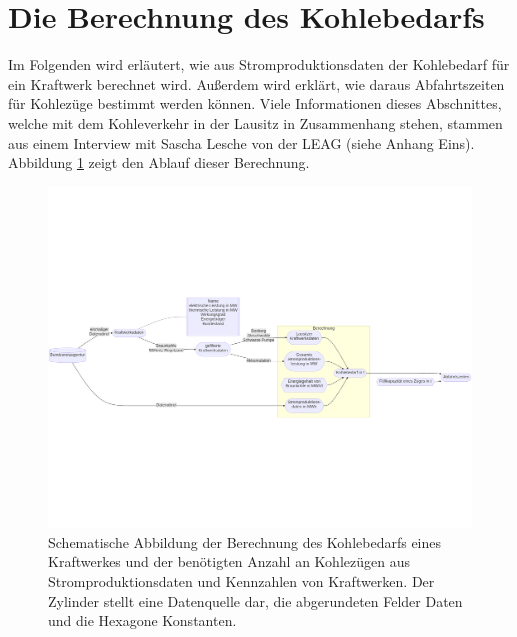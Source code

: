 \section{Die Berechnung des Kohlebedarfs}

Im Folgenden wird erläutert, wie aus Stromproduktionsdaten der Kohlebedarf für ein Kraftwerk berechnet wird. Außerdem wird erklärt, wie daraus Abfahrtszeiten für Kohlezüge bestimmt werden können. Viele Informationen dieses Abschnittes, welche mit dem Kohleverkehr in der Lausitz in Zusammenhang stehen, stammen aus einem Interview mit Sascha Lesche von der LEAG (siehe Anhang Eins). Abbildung \ref{fig:demand-calculation} zeigt den Ablauf dieser Berechnung.

\begin{figure}
	\centering
	\includegraphics[width=1.0\linewidth]{images/diagrams/demand-calculation.png}
	\caption{Schematische Abbildung der Berechnung des Kohlebedarfs eines Kraftwerkes und der benötigten Anzahl an Kohlezügen aus Stromproduktionsdaten und Kennzahlen von Kraftwerken. Der Zylinder stellt eine Datenquelle dar, die abgerundeten Felder Daten und die Hexagone Konstanten.}
	\label{fig:demand-calculation}
\end{figure}

